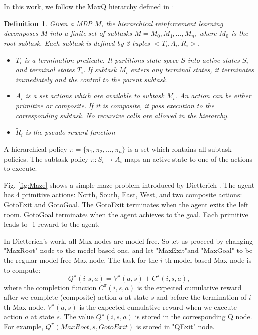 \documentclass{article} %
\newtheorem{definition}{Definition}
\begin{document}
In this work, we follow the MaxQ hierarchy defined in \cite{MaxQ}:
\begin{definition}
    Given a MDP $M$, the hierarchical reinforcement learning decomposes $M$ into a finite
    set of subtasks $M = {M_0, M_1, \dots, M_n}$, where $M_0$ is the root subtask. 
    Each subtask is defined by 3 tuples $<T_i, A_i, \tilde{R}_i>$. 
    \begin{itemize}{}
    \item $T_i$ is a termination predicate. It partitions state space $S$ into active states $S_i$ and
                terminal states $T_i$. If subtask $M_i$ enters any terminal states, it terminates immediately
                and the control to the parent subtask. 
    \item $A_i$ is a set actions which are available to subtask $M_i$. An action can be either primitive or composite.
                If it is composite, it pass execution to the corresponding subtask. No recursive calls 
                are allowed in the hierarchy.
    \item $\tilde{R}_i$ is the pseudo reward function 
    \end{itemize}
\end{definition}
A hierarchical policy $\pi = \{\pi_1, \pi_2, \dots, \pi_n\}$ is a set which contains all subtask policies. 
The subtask policy $\pi: S_i \rightarrow A_i$ maps an active state to one of the actions to execute.

Fig. \ref{fig:Maze} shows a simple maze problem introduced by Dietterich \cite{MaxQJ}.
The agent has 4 primitive actions: North, South, East, West, and two composite actions: GotoExit and GotoGoal.
The 
GotoExit terminates when the agent exits the left room. GotoGoal terminates when the agent achieves to the goal.
Each primitive leads to -1 reward to the agent.


In Dietterich's work, all Max nodes are model-free. 
So let us proceed by changing "MaxRoot" node to the model-based one, and let "MaxExit"and "MaxGoal"
to be the regular model-free Max node.
The task for the $i$-th model-based Max node is to compute:
\begin{equation}
    Q^{\pi}(i, s, a) = V^{\pi}(a, s) + C^{\pi}(i, s, a),
\end{equation}
where the completion function $C^{\pi}(i, s, a)$ is the expected cumulative reward after
we complete (composite) action $a$ at state $s$ and before the termination of $i$-th Max node.
$V^{\pi}(a, s)$ is the 
expected cumulative reward when we execute action $a$ at state $s$.
The value $Q^{\pi}(i, s, a)$ is stored in the corresponding Q node.
For example, $Q^{\pi}(MaxRoot, s, GotoExit)$ is stored in "QExit" node.
\end{document}
